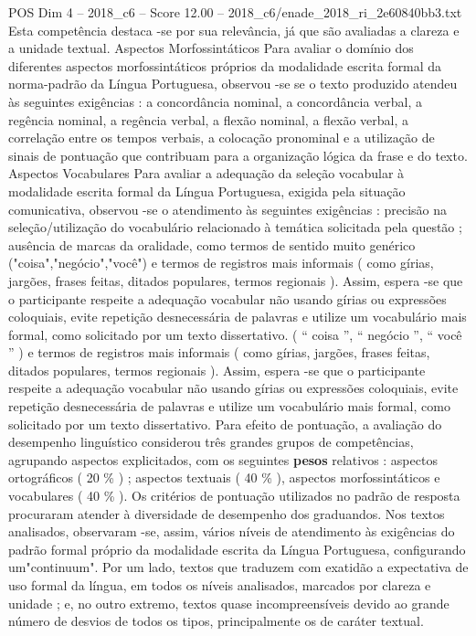 \begin{textsample}{POS Dim 4 – 2018\_c6 – Score 12.00 – 2018\_c6/enade\_2018\_ri\_2e60840bb3.txt}
Esta competência destaca -se por sua relevância, já que são avaliadas a clareza e a unidade textual.
Aspectos Morfossintáticos Para avaliar o domínio dos diferentes aspectos morfossintáticos próprios da modalidade escrita formal da norma-padrão da Língua Portuguesa, observou -se se o texto produzido atendeu às seguintes exigências : a concordância nominal, a concordância verbal, a regência nominal, a regência verbal, a flexão nominal, a flexão verbal, a correlação entre os tempos verbais, a colocação pronominal e a utilização de sinais de pontuação que contribuam para a organização lógica da frase e do texto.
Aspectos Vocabulares Para avaliar a adequação da seleção vocabular à modalidade escrita formal da Língua Portuguesa, exigida pela situação comunicativa, observou -se o atendimento às seguintes exigências : precisão na seleção/utilização do vocabulário relacionado à temática solicitada pela questão ; ausência de marcas da oralidade, como termos de sentido muito genérico ("coisa","negócio","você") e termos de registros mais informais ( como gírias, jargões, frases feitas, ditados populares, termos regionais ).
Assim, espera -se que o participante respeite a adequação vocabular não usando gírias ou expressões coloquiais, evite repetição desnecessária de palavras e utilize um vocabulário mais formal, como solicitado por um texto dissertativo. ( “ coisa ”, “ negócio ”, “ você ” ) e termos de registros mais informais ( como gírias, jargões, frases feitas, ditados populares, termos regionais ).
Assim, espera -se que o participante respeite a adequação vocabular não usando gírias ou expressões coloquiais, evite repetição desnecessária de palavras e utilize um vocabulário mais formal, como solicitado por um texto dissertativo.
Para efeito de pontuação, a avaliação do desempenho linguístico considerou três grandes grupos de competências, agrupando aspectos explicitados, com os seguintes \textbf{pesos} relativos : aspectos ortográficos ( 20 \% ) ; aspectos textuais ( 40 \% ), aspectos morfossintáticos e vocabulares ( 40 \% ).
Os critérios de pontuação utilizados no padrão de resposta procuraram atender à diversidade de desempenho dos graduandos.
Nos textos analisados, observaram -se, assim, vários níveis de atendimento às exigências do padrão formal próprio da modalidade escrita da Língua Portuguesa, configurando um"continuum".
Por um lado, textos que traduzem com exatidão a expectativa de uso formal da língua, em todos os níveis analisados, marcados por clareza e unidade ; e, no outro extremo, textos quase incompreensíveis devido ao grande número de desvios de todos os tipos, principalmente os de caráter textual.

\end{textsample}

